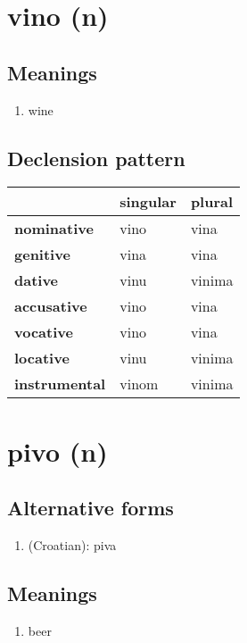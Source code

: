 \filbreak
\section{vino (n)}
\subsection*{Meanings}
\begin{enumerate}
\item wine
\end{enumerate}
\subsection*{Declension pattern}
\begin{tabularx}{\linewidth}{Xll}
\toprule
{} & singular &  plural \\
\midrule
\textbf{nominative  } &     vino &    vina \\
\textbf{genitive    } &     vina &    vina \\
\textbf{dative      } &     vinu &  vinima \\
\textbf{accusative  } &     vino &    vina \\
\textbf{vocative    } &     vino &    vina \\
\textbf{locative    } &     vinu &  vinima \\
\textbf{instrumental} &    vinom &  vinima \\
\bottomrule
\end{tabularx}

\filbreak
\section{pivo (n)}
\subsection*{Alternative forms}
\begin{enumerate}
\item (Croatian): piva
\end{enumerate}
\subsection*{Meanings}
\begin{enumerate}
\item beer
\end{enumerate}
